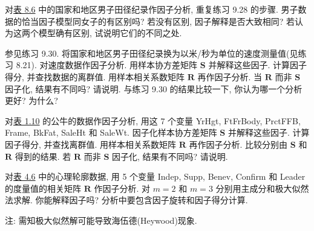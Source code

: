 \quad 对\hyperref[tab:8.6]{表 8.6} 中的国家和地区男子田径纪录作因子分析, 重复练习 9.28 的步骤. 男子数据的恰当因子模型同女子的有区别吗? 若没有区别, 因子解释是否大致相同? 若认为这两个模型确有区别, 试说明它们的不同之处.

\quad 参见练习 9.30. 将国家和地区男子田径纪录换为以米/秒为单位的速度测量值(见练习 8.21). 对速度数据作因子分析. 用样本协方差矩阵 $\mathbf{S}$ 并解释这些因子. 计算因子得分, 并查找数据的离群值. 用样本相关系数矩阵 $\mathbf{R}$ 再作因子分析. 当 $\mathbf{R}$ 而非 $\mathbf{S}$ 因子化, 结果有不同吗? 请说明. 与练习 9.30 的结果比较一下, 你认为哪一个分析更好? 为什么?

\quad 对\hyperref[tab:1.10]{表 1.10} 的公牛的数据作因子分析, 用这 7 个变量 YrHgt, FtFrBody, PrctFFB, Frame, BkFat, SaleHt 和 SaleWt. 因子化样本协方差矩阵 $\mathbf{S}$ 并解释这些因子. 计算因子得分, 并查找离群值. 用样本相关系数矩阵 $\mathbf{R}$ 再作因子分析. 比较分别由 $\mathbf{S}$ 和 $\mathbf{R}$ 得到的结果. 若 $\mathbf{R}$ 而非 $\mathbf{S}$ 因子化, 结果有不同吗? 请说明.

\quad 对\hyperref[tab:4.6]{表 4.6} 中的心理轮廓数据, 用 5 个变量 Indep, Supp, Benev, Confirm 和 Leader 的度量值的相关矩阵 $\mathbf{R}$ 作因子分析. 对 $m=2$ 和 $m=3$ 分别用主成分和极大似然法求解. 你能解释因子吗? 分析中要包含因子旋转和因子得分计算.

注: 需知极大似然解可能导致海伍德(Heywood)现象.
